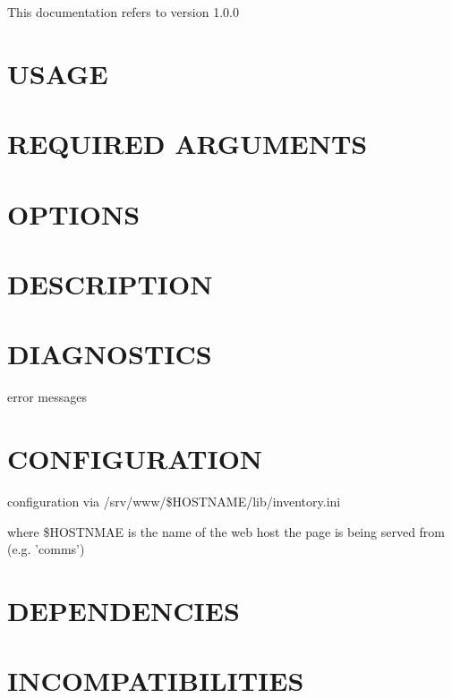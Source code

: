 \documentclass{book}
\begin{document}
This documentation refers to version 1.0.0


\section{USAGE}
\label{_USAGE}
\hypertarget{_USAGE}{}


\section{REQUIRED ARGUMENTS}
\label{_REQUIRED_ARGUMENTS}
\hypertarget{_REQUIRED_ARGUMENTS}{}


\section{OPTIONS}
\label{_OPTIONS}
\hypertarget{_OPTIONS}{}


\section{DESCRIPTION}
\label{_DESCRIPTION}
\hypertarget{_DESCRIPTION}{}


\section{DIAGNOSTICS}
\label{_DIAGNOSTICS}
\hypertarget{_DIAGNOSTICS}{}



error messages


\section{CONFIGURATION}
\label{_CONFIGURATION}
\hypertarget{_CONFIGURATION}{}



configuration via /srv/www/\$HOSTNAME/lib/inventory.ini



where \$HOSTNMAE is the name of the web host the page is being served from (e.g. 'comms')


\section{DEPENDENCIES}
\label{_DEPENDENCIES}
\hypertarget{_DEPENDENCIES}{}


\section{INCOMPATIBILITIES}
\label{_INCOMPATIBILITIES}
\hypertarget{_INCOMPATIBILITIES}{}
\end{document}
